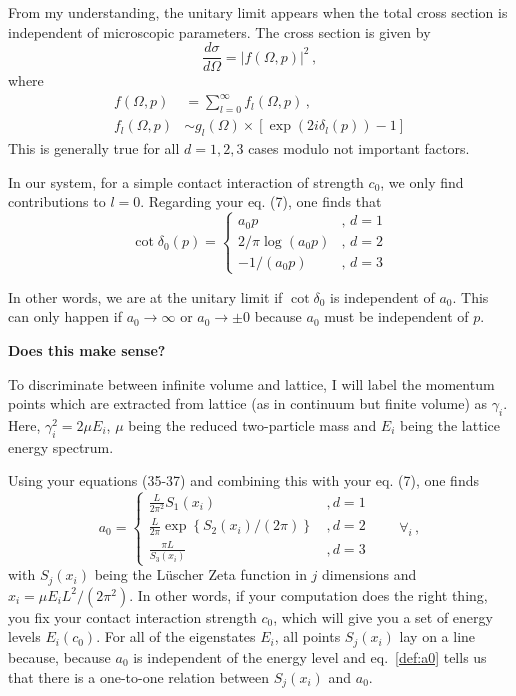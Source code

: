 \documentclass[
    aps,
    prl,
    showkeys,
    nofootinbib,
    floatfix
]{revtex4-1}
\begin{document}
From my understanding, the unitary limit appears when the total cross section is independent of microscopic parameters.
The cross section is given by
\begin{equation}
	\frac{d \sigma}{d \Omega} = | f(\Omega, p) | ^ 2 \, ,
\end{equation}
where
\begin{align}
	f(\Omega, p) &= \sum_{l=0}^{\infty} f_l(\Omega, p) \, , \\ 
	f_l(\Omega, p) &\sim g_l(\Omega) \times \left[\exp( 2 i \delta_l (p)) - 1\right]
\end{align}
This is generally true for all $d = 1, 2, 3$ cases modulo not important factors.

In our system, for a simple contact interaction of strength $c_0$, we only find contributions to $l=0$.
Regarding your eq. (7), one finds that
\begin{equation}
	\cot \delta_0 (p) = \begin{cases}
		a_0 p &, \, d = 1 \\
		2 / \pi \log(a_0 p) &, \, d = 2 \\
		- 1/(a_0 p) &, \, d = 3
	\end{cases}
\end{equation}

In other words, we are at the unitary limit if $\cot \delta_0$ is independent of $a_0$.
This can only happen if $a_0 \rightarrow \infty$ or $a_0 \rightarrow \pm 0$ because $a_0$ must be independent of $p$.

\textbf{Does this make sense?}

To discriminate between infinite volume and lattice, I will label the momentum points which are extracted from lattice (as in continuum but finite volume) as $\gamma_i$.
Here, $\gamma_i^2 = 2 \mu E_i$, $\mu$ being the reduced two-particle mass and $E_i$ being the lattice energy spectrum.

Using your equations (35-37) and combining this with your eq. (7), one finds
\begin{equation}\label{def:a0}
	a_0 = \begin{cases}
		\frac{L}{2\pi^2}S_1(x_i) & \, , d =1 \\
		\frac{L}{2\pi} \exp \left\{ S_2(x_i) / (2\pi) \right\} & \, , d =2 \\
		\frac{ \pi L}{ S_3(x_i) } & \, , d =3
	\end{cases}
	\qquad \forall_i \, ,
\end{equation}
with $S_j(x_i)$ being the Lüscher Zeta function in $j$ dimensions and $ x_i = \mu E_i L ^2 / (2 \pi^2) $.
In other words, if your computation does the right thing, you fix your contact interaction strength $c_0$, which will give you a set of energy levels $E_i(c_0)$.
For all of the eigenstates $E_i$, all points $S_j(x_i)$ lay on a line because, because $a_0$ is independent of the energy level and eq.~\eqref{def:a0} tells us that there is a one-to-one relation between $S_j(x_i)$ and $a_0$.
\end{document}
